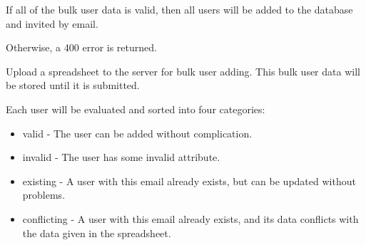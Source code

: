\documentclass[letterpaper,10pt,english]{sphinxmanual}
\begin{document}
\begin{fulllineitems}
\begin{fulllineitems}
\begin{quote}
\begin{description}
\end{description}\end{quote}

\end{fulllineitems}


\begin{fulllineitems}
\label{\detokenize{apidoc/utdesign_procurement:utdesign_procurement.apigateway.ApiGateway.userSpreadsheetSubmit}}
If all of the bulk user data is valid, then all users will be added
to the database and invited by email.

Otherwise, a 400 error is returned.

\end{fulllineitems}


\begin{fulllineitems}
\label{\detokenize{apidoc/utdesign_procurement:utdesign_procurement.apigateway.ApiGateway.userSpreadsheetUpload}}
Upload a spreadsheet to the server for bulk user adding. This bulk
user data will be stored until it is submitted.

Each user will be evaluated and sorted into four categories:
\begin{itemize}
\item {} 
valid - The user can be added without complication.

\item {} 
invalid - The user has some invalid attribute.

\item {} 
existing - A user with this email already exists, but can be updated
without problems.

\item {} 
conflicting - A user with this email already exists, and its data
conflicts with the data given in the spreadsheet.

\end{itemize}


\end{fulllineitems}
\end{fulllineitems}
\end{document}
